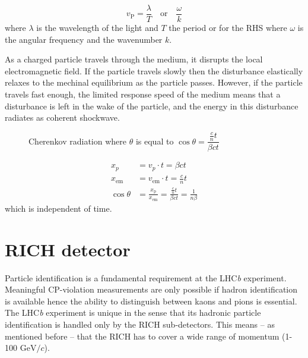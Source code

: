 \documentclass[11pt,twoside]{scrreprt}
\begin{document}
\[ v_{\text{P}} = \frac{\lambda}{T} \quad \text{or} \quad \frac{\omega}{k}\]
where $\lambda$ is the wavelength of the light and $T$ the period or for the RHS where $\omega$ is the angular frequency and the wavenumber $k$.

As a charged particle travels through the medium, it disrupts the local electromagnetic field. If the particle travels slowly then the disturbance elastically relaxes to the mechinal equilibrium as the particle passes. However, if the particle travels fast enough, the limited response speed of the medium means that a disturbance is left in the wake of the particle, and the energy in this disturbance radiates as coherent shockwave.

\begin{figure}[htbp]
  \centering
  \caption{Cherenkov radiation where $\theta$ is equal to $\cos\theta = \dfrac{\frac{c}{n}t}{\beta ct}$}
  \label{fig:label}
\end{figure}

\begin{align}
    x_p &= v_{p}\cdot t = \beta c t \nonumber \\
    x_{\text{em}} &= v_{\text{em}}\cdot t=\frac{c}{n}t \nonumber \\
    \cos\theta &= \frac{x_{\text{p}}}{x_{\text{em}}} = \frac{\frac{c}{n}t}{\beta c t} = \frac{1}{n\beta} \nonumber
\end{align}
which is independent of time.

\section{RICH detector} %
\label{sec:rich_detector}

Particle identification is a fundamental requirement at the LHC\textit{b} experiment. Meaningful CP-violation measurements are only possible if hadron identification is available hence the ability to distinguish between kaons and pions is  essential.
The LHC\textit{b} experiment is unique in the sense that its hadronic particle identification is handled only by the RICH sub-detectors. This means -- as mentioned before -- that the RICH has to cover a wide range of momentum (1-100 $\text{GeV}/c$).
\end{document}
